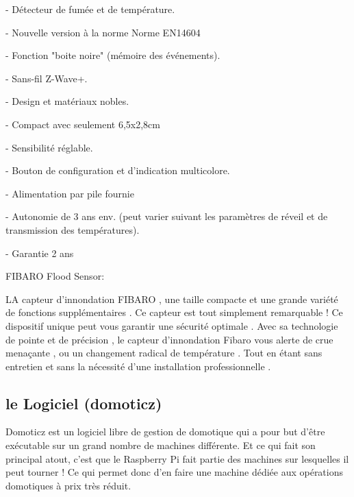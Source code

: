 -    Détecteur de fumée et de température.


-    Nouvelle version à la norme Norme EN14604


-    Fonction "boite noire" (mémoire des événements).


-    Sans-fil Z-Wave+.


-    Design et matériaux nobles.


-    Compact avec seulement 6,5x2,8cm


-    Sensibilité réglable.


-    Bouton de configuration et d'indication multicolore.


-    Alimentation par pile fournie 


-    Autonomie de 3 ans env. (peut varier suivant les paramètres de réveil et de transmission des températures).


-    Garantie 2 ans

FIBARO Flood Sensor:

LA capteur d'innondation FIBARO , une taille compacte et une grande variété de fonctions supplémentaires . Ce capteur est tout simplement remarquable ! Ce dispositif unique peut vous garantir une sécurité optimale . Avec sa technologie de pointe et de précision , le capteur d'innondation Fibaro vous alerte de crue menaçante , ou un changement radical de température . Tout en étant sans entretien et sans la nécessité d'une installation professionnelle .


\subsection*{le Logiciel (domoticz)}
Domoticz est un logiciel libre de gestion de domotique qui a pour but d’être exécutable sur un grand nombre de machines différente. Et ce qui fait son principal atout, c’est que le Raspberry Pi fait partie des machines sur lesquelles il peut tourner ! Ce qui permet donc d’en faire une machine dédiée aux opérations domotiques à prix très réduit. 
% 
%
%
%
%


